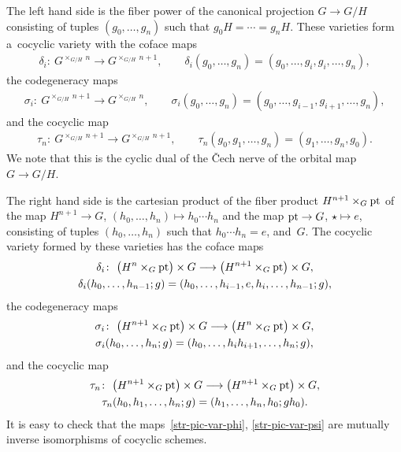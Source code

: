 \documentclass[pdftex]{sigma}
\numberwithin{equation}{section}
\begin{document}
The left hand side is the f\/iber power of the canonical projection $G\rightarrow G/H$ consisting of tuples
$(g_{0},\ldots, g_{n})$ such that $g_{0}H=\cdots =g_{n}H$.
These varieties form a~cocyclic variety with the coface maps
\begin{gather*}%
\delta_{i}\colon \  G^{\times_{G/H}\ n}\longrightarrow G^{\times_{G/H}\ n+1},  \qquad
\delta_{i}(g_{0}, \ldots, g_{n})=(g_{0}, \ldots, g_{i}, g_{i}, \ldots, g_{n}),
\end{gather*}
the codegeneracy maps
\begin{gather*}
\sigma_{i}\colon \ G^{\times_{G/H}\ n+1}\longrightarrow G^{\times_{G/H}\ n},  \qquad
\sigma_{i}(g_{0}, \ldots, g_{n})=(g_{0}, \ldots, g_{i-1},g_{i+1}, \ldots, g_{n}),
\end{gather*}
and the cocyclic map
\begin{gather*}
\tau_{n}\colon \  G^{\times_{G/H}\ n+1}\longrightarrow G^{\times_{G/H}\ n+1},  \qquad
\tau_{n}(g_{0}, g_{1},\ldots, g_{n})=(g_{1}, \ldots, g_{n}, g_{0}).
\end{gather*}
We note that this is the cyclic dual of the \v{C}ech nerve of the orbital map $G\rightarrow G/H$.

The right hand side is the cartesian product of the f\/iber product $H^{n+1}\times_{G}{\rm pt}$ of the map
$H^{n+1}\rightarrow G$, $(h_{0},\ldots, h_{n})\mapsto h_{0}\cdots h_{n}$ and the map ${\rm pt}\rightarrow G$,
$\star\mapsto e$, consisting of tuples $(h_{0},\ldots, h_{n})$ such that $h_{0}\cdots h_{n}=e$, and~$G$.
The cocyclic variety formed by these varieties has the coface maps
\begin{gather*}%
\delta_{i}\colon \  \big(H^{n}\times_{G}{\rm pt}\big)\times G\longrightarrow \big(H^{n+1}\times_{G}{\rm pt}\big)\times G,
\\
\delta_{i}(h_{0}, \ldots, h_{n-1}; g)=(h_{0}, \ldots, h_{i-1}, e, h_{i}, \ldots, h_{n-1}; g),
\end{gather*}
the codegeneracy maps
\begin{gather*}%
\sigma_{i}\colon \ \big(H^{n+1}\times_{G}{\rm pt}\big)\times G\longrightarrow \big(H^{n}\times_{G}{\rm pt}\big)\times G,
\\
\sigma_{i}(h_{0}, \ldots, h_{n}; g)=(h_{0}, \ldots, h_{i}h_{i+1}, \ldots, h_{n}; g),
\end{gather*}
and the cocyclic map
\begin{gather*}%
\tau_{n}\colon \ \big(H^{n+1}\times_{G}{\rm pt}\big)\times G\longrightarrow \big(H^{n+1}\times_{G}{\rm pt}\big)\times G,
\\
\tau_{n}(h_{0}, h_{1},\ldots, h_{n}; g)=(h_{1}, \ldots, h_{n}, h_{0}; gh_{0}).
\end{gather*}
It is easy to check that the maps~\eqref{str-pic-var-phi}, \eqref{str-pic-var-psi} are mutually inverse isomorphisms of
cocyclic schemes.
\end{document}
